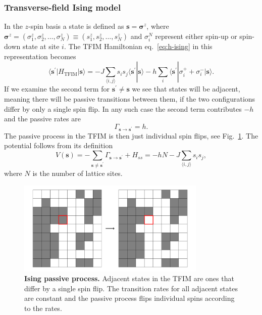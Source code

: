 \subsubsection{Transverse-field Ising model}
\label{subsubsec:res-im}
In the $z$-spin basis a state is defined as $\mathbf{s} = \boldsymbol{\sigma}^z$, where $\boldsymbol{\sigma}^z = (\sigma_1^z, \sigma_2^z, \ldots, \sigma_N^z) \equiv (s_1^z, s_2^z, \ldots, s_N^z)$ and $\sigma_i^N$ represent either spin-up or spin-down state at site $i$. The TFIM Hamiltonian eq.~\eqref{eq:h-ising} in this representation becomes
\begin{equation}
	\langle \mathbf{s}^\prime | H_{\text{TFIM}} | \mathbf{s}\rangle = -J \sum_{\langle i, j \rangle} s_i s_j \langle \mathbf{s}^\prime | \mathbf{s}\rangle -h \sum_i \langle \mathbf{s}^\prime | \sigma_{i}^+ + \sigma_{i}^- | \mathbf{s} \rangle.
\end{equation}
If we examine the second term for $\mathbf{s}^\prime \neq \mathbf{s}$ we see that states will be adjacent, meaning there will be passive transitions between them, if the two configurations differ by only a single spin flip. In any such case the second term contributes $-h$ and the passive rates are
\begin{equation}
	\Gamma_{\mathbf{s}\rightarrow\mathbf{s}^\prime} = h.
\end{equation}
The passive process in the TFIM is then just individual spin flips, see Fig.~\ref{fig:isingpassive}. The potential follows from its definition
\begin{equation}
	V(\mathbf{s}) = -\sum_{\mathbf{s} \neq \mathbf{s}^\prime} \Gamma_{\mathbf{s}\rightarrow\mathbf{s}^\prime} + H_{ss} = -hN - J\sum_{\langle i, j \rangle} s_i s_j,
\end{equation}
where $N$ is the number of lattice sites.
\begin{figure}[h]
	\centering
	\includegraphics[height=4.5cm]{Chapter5/Figs/Vector/ising_passive}
	\caption[Ising passive process]{\textbf{Ising passive process.} Adjacent states in the TFIM are ones that differ by a single spin flip. The transition rates for all adjacent states are constant and the passive process flips individual spins according to the rates.}	
	\label{fig:isingpassive}
\end{figure}
